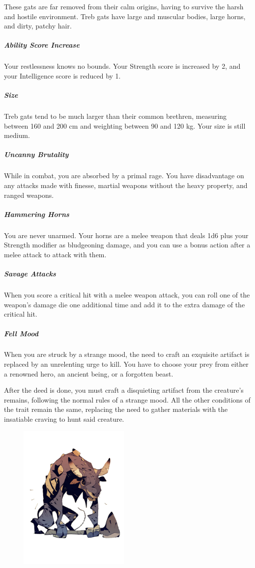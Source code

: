 \begin{linenumbers}
These gats are far removed from their calm origins, having to survive the harsh and hostile environment.
Treb gats have large and muscular bodies, large horns, and dirty, patchy hair.

\subparagraph{Ability Score Increase} Your restlessness knows no bounds.
Your Strength score is increased by 2, and your Intelligence score is reduced by 1.

\subparagraph{Size} Treb gats tend to be much larger than their common brethren, measuring between 160 and 200 cm and weighting between 90 and 120 kg.
Your size is still medium.

\subparagraph{Uncanny Brutality} While in combat, you are absorbed by a primal rage.
You have disadvantage on any attacks made with finesse, martial weapons without the heavy property, and ranged weapons.

\subparagraph{Hammering Horns} You are never unarmed.
Your horns are a melee weapon that deals 1d6 plus your Strength modifier as bludgeoning damage, and you can use a bonus action after a melee attack to attack with them.

\subparagraph{Savage Attacks} When you score a critical hit with a melee weapon attack, you can roll one of the weapon's damage die one additional time and add it to the extra damage of the critical hit.

\subparagraph{Fell Mood} When you are struck by a strange mood, the need to craft an exquisite artifact is replaced by an unrelenting urge to kill.
You have to choose your prey from either a renowned hero, an ancient being, or a forgotten beast.

After the deed is done, you must craft a disquieting artifact from the creature's remains, following the normal rules of a strange mood.
All the other conditions of the trait remain the same, replacing the need to gather materials with the insatiable craving to hunt said creature.

\begin{figure}[!b]
    \centering
    \includegraphics[width=0.48\textwidth]{02kins/img/11gat_treb.png}
\end{figure}
\end{linenumbers}
